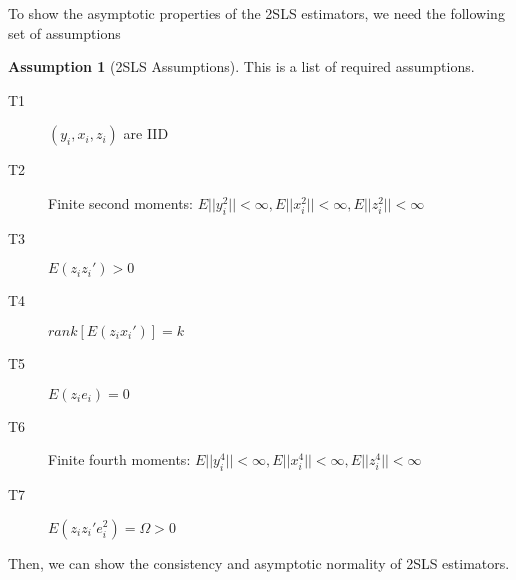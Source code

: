 \documentclass[12pt]{article}
\theoremstyle{definition}
\theoremstyle{property}
\theoremstyle{assumption}
\newtheorem{assumption}{Assumption}[section]
\theoremstyle{example}
\theoremstyle{comment}
\begin{document}
To show the asymptotic properties of the 2SLS estimators, we need the following set of assumptions
\begin{mdframed}[backgroundcolor=blue!5] 
\begin{assumption}[2SLS Assumptions] This is a list of required assumptions. 
\begin{description}
\item[T1] $(y_i, x_i, z_i)$ are IID
\item[T2] Finite second moments: $E||y_i^2||<\infty, E||x_i^2||<\infty, E||z_i^2||<\infty$
\item[T3] $E(z_iz_i')>0$
\item[T4] $rank[E(z_ix_i')]=k$
\item[T5] $E(z_ie_i)=0$
\item[T6] Finite fourth moments: $E||y_i^4||<\infty, E||x_i^4||<\infty, E||z_i^4||<\infty$
\item[T7] $E(z_iz_i'e_i^2)=\Omega>0$
\end{description}
\end{assumption}
\end{mdframed}\par
Then, we can show the consistency and asymptotic normality of 2SLS estimators. 
\end{document}
